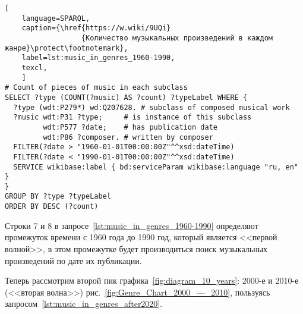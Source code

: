 \begin{lstlisting}[ 
    language=SPARQL,
    caption={\href{https://w.wiki/9UQi}
                  {Количество музыкальных произведений в каждом жанре}\protect\footnotemark},
    label=lst:music_in_genres_1960-1990,
    texcl,
    ]
# Count of pieces of music in each subclass
SELECT ?type (COUNT(?music) AS ?count) ?typeLabel WHERE {
  ?type (wdt:P279*) wd:Q207628. # subclass of composed musical work
  ?music wdt:P31 ?type;     # is instance of this subclass
         wdt:P577 ?date;    # has publication date
         wdt:P86 ?composer. # written by composer
  FILTER(?date > "1960-01-01T00:00:00Z"^^xsd:dateTime)        
  FILTER(?date < "1990-01-01T00:00:00Z"^^xsd:dateTime)
  SERVICE wikibase:label { bd:serviceParam wikibase:language "ru, en" }
}
GROUP BY ?type ?typeLabel
ORDER BY DESC (?count)
\end{lstlisting}%

Строки 7 и 8 в запросе~\ref{lst:music_in_genres_1960-1990} определяют промежуток времени с 1960 года до 1990 год, который является <<первой волной>>, в этом промежутке будет производиться поиск музыкальных произведений по дате их публикации.







Теперь рассмотрим второй пик графика~\ref{fig:diagram_10_years}: 2000-е и 2010-е (<<вторая волна>>) рис.~\ref{fig:Genre_Chart_2000_—_2010}, пользуясь запросом~\ref{lst:music_in_genres_after2020}.

